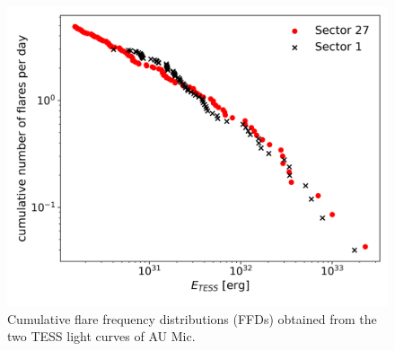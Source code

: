 \documentclass[fleqn,usenatbib]{mnras}%
\begin{document}
\begin{figure}
\includegraphics[width=\hsize]{figures/ffd.png} 
\caption{Cumulative flare frequency distributions (FFDs) obtained from the two TESS light curves of AU Mic.}
\label{fig:ffd}
\end{figure}
\end{document}
